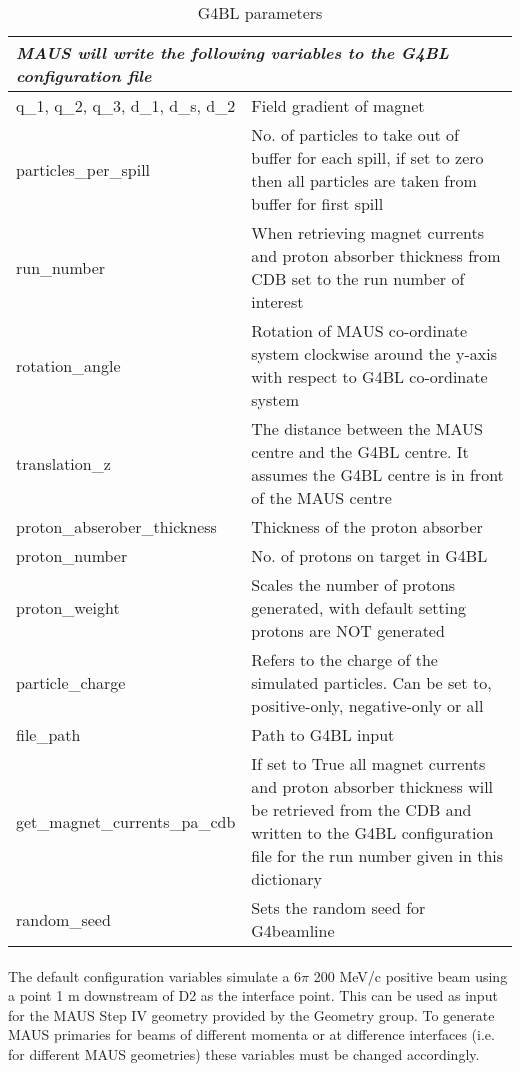 \begin{table}
\caption{G4BL parameters}
\begin{tabular}{|l | p{10cm}|}
\hline
\multicolumn{2}{|l|}{\textit{MAUS will write the following variables to the G4BL configuration file}} \\
\hline
q\_1, q\_2, q\_3, d\_1, d\_s, d\_2 & Field gradient of magnet \\
\hline
particles\_per\_spill & No. of particles to take out of buffer for each spill, if set to zero then all particles are taken from buffer for first spill \\
\hline
run\_number & When retrieving magnet currents and proton absorber thickness from CDB set to the run number of interest \\
\hline
rotation\_angle & Rotation of MAUS co-ordinate system clockwise around the y-axis with respect to G4BL co-ordinate system \\
\hline
translation\_z & The distance between the MAUS centre and the G4BL centre. It assumes the G4BL centre is in front of the MAUS centre \\
\hline
proton\_abserober\_thickness & Thickness of the proton absorber \\
\hline
proton\_number & No. of protons on target in G4BL \\
\hline
proton\_weight & Scales the number of protons generated, with default setting protons are NOT generated \\
\hline
particle\_charge & Refers to the charge of the simulated particles. Can be set to, positive-only, negative-only or all \\
\hline
file\_path & Path to G4BL input \\
\hline
get\_magnet\_currents\_pa\_cdb & If set to True all magnet currents and proton absorber thickness will be retrieved from the CDB and written to the G4BL configuration file for the run number given in this dictionary \\
\hline
random\_seed & Sets the random seed for G4beamline \\
\hline 
\end{tabular}
\label{table}
\end{table}

\paragraph{}

The default configuration variables simulate a 6$\pi$ 200 MeV/c positive beam using a point 1 m downstream of D2 as the interface point. This can be used as input for the MAUS Step IV geometry provided by the Geometry group. To generate MAUS primaries for beams of different momenta or at difference interfaces (i.e. for different MAUS geometries) these variables must be changed accordingly. 

